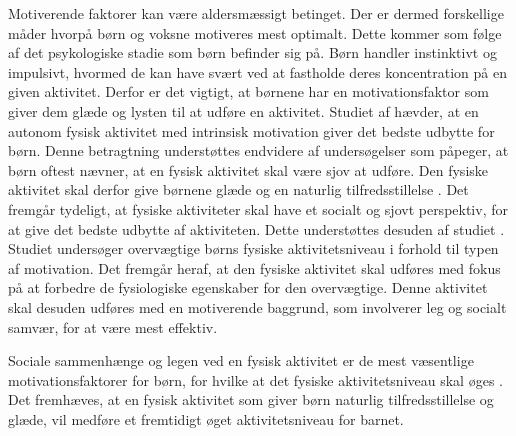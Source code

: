 Motiverende faktorer kan være aldersmæssigt betinget. Der er dermed forskellige måder hvorpå børn og voksne motiveres mest optimalt. Dette kommer som følge af det psykologiske stadie som børn befinder sig på. \newline
Børn handler instinktivt og impulsivt, hvormed de kan have svært ved at fastholde deres koncentration på en given aktivitet. Derfor er det vigtigt, at børnene har en motivationsfaktor som giver dem glæde og lysten til at udføre en aktivitet. \citep{V.Brown2007} \newline
Studiet af \cite{J.SebireJagoR.FoxEtAl2013} hævder, at en autonom fysisk aktivitet med intrinsisk motivation giver det bedste udbytte for børn. Denne betragtning understøttes endvidere af undersøgelser som påpeger, at børn oftest nævner, at en fysisk aktivitet skal være sjov at udføre. Den fysiske aktivitet skal derfor give børnene glæde og en naturlig tilfredsstillelse \citep{Q.Romani2013}. \newline
Det fremgår tydeligt, at fysiske aktiviteter skal have et socialt og sjovt perspektiv, for at give det bedste udbytte af aktiviteten. Dette understøttes desuden af studiet \cite{McWhorter2003}. Studiet undersøger overvægtige børns fysiske aktivitetsniveau i forhold til typen af motivation. Det fremgår heraf, at den fysiske aktivitet skal udføres med fokus på at forbedre de fysiologiske egenskaber for den overvægtige. Denne aktivitet skal desuden udføres med en motiverende baggrund, som involverer leg og socialt samvær, for at være mest effektiv. \citep{McWhorter2003} \newline

Sociale sammenhænge og legen ved en fysisk aktivitet er de mest væsentlige motivationsfaktorer for børn, for hvilke at det fysiske aktivitetsniveau skal øges \citep{McWhorter2003,J.SebireJagoR.FoxEtAl2013}. Det fremhæves, at en fysisk aktivitet som giver børn naturlig tilfredsstillelse og glæde, vil medføre et fremtidigt øget aktivitetsniveau for barnet.

